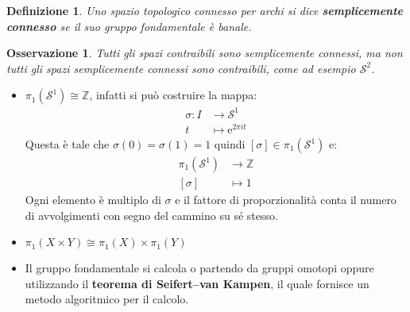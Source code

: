 \documentclass[10pt, twoside=false, x11names]{scrbook}
\newtheorem{osservation}[theorem]{Osservazione}
\newtheorem{definition}[theorem]{Definizione}
\newcommand{\Z}{\mathbb{Z}}
\newcommand{\me}{\mathrm{e}}
\newcommand{\Sph}[1][]{\mathcal{S}^#1}
\begin{document}
\begin{definition}
  Uno spazio topologico connesso per archi si dice \textbf{semplicemente connesso}
  se il suo gruppo fondamentale è banale.
\end{definition}

\begin{osservation}
  Tutti gli spazi contraibili sono semplicemente connessi, ma
  non tutti gli spazi semplicemente connessi sono contraibili, come ad esempio $ \Sph{2} $.
\end{osservation}

\begin{itemize}
\item $ \pi_1(\Sph{1}) \cong \Z $, infatti si può costruire la mappa:
  \begin{align*}
    \sigma \colon I & \to \Sph{1} \\
    t & \mapsto  \me^{2 \pi i t}
  \end{align*}
  Questa è tale che $ \sigma(0) = \sigma(1) = 1 $ quindi $ [\sigma] \in \pi_1(\Sph{1}) $ e:
  \begin{align*}
    \pi_1(\Sph{1}) & \to \Z \\
    [\sigma] & \mapsto  1
  \end{align*}
  Ogni elemento è multiplo di $ \sigma $ e il fattore di proporzionalità conta il numero di avvolgimenti
  con segno del cammino su sé stesso.
\item $ \pi_1(X \times Y) \cong \pi_1(X) \times \pi_1(Y) $
\item Il gruppo fondamentale si calcola o partendo da gruppi omotopi oppure utilizzando il \textbf{teorema di Seifert–van Kampen}, 
  il quale fornisce un metodo algoritmico per il calcolo.
\end{itemize}
\end{document}
